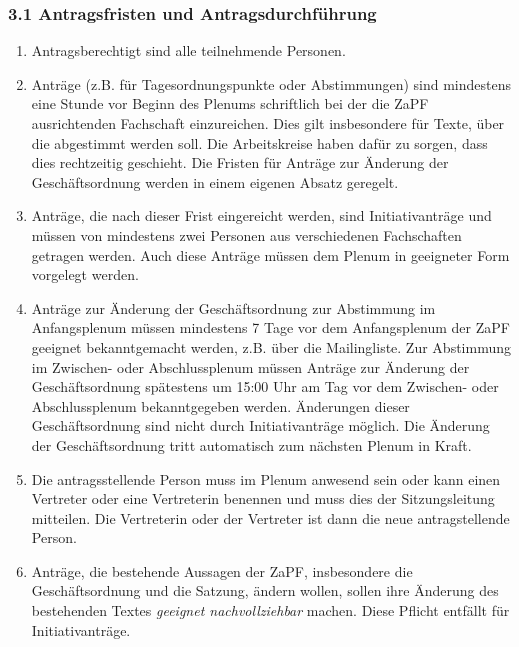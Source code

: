 \subsubsection*{3.1 Antragsfristen und Antragsdurchführung%
  \label{antragsfristen-und-antragsdurchfuhrung}%
}

\begin{enumerate}
\item Antragsberechtigt sind alle teilnehmende Personen.

\item Anträge (z.B. für Tagesordnungspunkte oder Abstimmungen) sind mindestens
eine Stunde vor Beginn des Plenums schriftlich bei der die ZaPF
ausrichtenden Fachschaft einzureichen.
Dies gilt insbesondere für Texte, über die abgestimmt werden soll.
Die Arbeitskreise haben dafür zu sorgen, dass dies rechtzeitig geschieht.
Die Fristen für Anträge zur Änderung der Geschäftsordnung werden in einem
eigenen Absatz geregelt.

\item Anträge, die nach dieser Frist eingereicht werden, sind Initiativanträge
und müssen von mindestens zwei Personen aus verschiedenen Fachschaften
getragen werden. Auch diese Anträge müssen dem Plenum in geeigneter Form
vorgelegt werden.

\item Anträge zur Änderung der Geschäftsordnung zur Abstimmung im Anfangsplenum
müssen mindestens 7 Tage vor dem Anfangsplenum der ZaPF geeignet
bekanntgemacht werden, z.B. über die Mailingliste.
Zur Abstimmung im Zwischen- oder Abschlussplenum müssen Anträge zur Änderung
der Geschäftsordnung spätestens um 15:00 Uhr am Tag vor dem Zwischen- oder
Abschlussplenum bekanntgegeben werden.
Änderungen dieser Geschäftsordnung sind nicht durch Initiativanträge möglich.
Die Änderung der Geschäftsordnung tritt automatisch zum nächsten Plenum in Kraft.

\item Die antragsstellende Person muss im Plenum anwesend sein
oder kann einen Vertreter oder eine Vertreterin benennen und muss dies
der Sitzungsleitung mitteilen.
Die Vertreterin oder der Vertreter ist dann die neue antragstellende Person.

\item Anträge, die bestehende Aussagen der ZaPF, insbesondere die Geschäftsordnung
und die Satzung, ändern wollen, sollen ihre Änderung des bestehenden Textes
\emph{geeignet nachvollziehbar} machen.
Diese Pflicht entfällt für Initiativanträge.
\end{enumerate}


